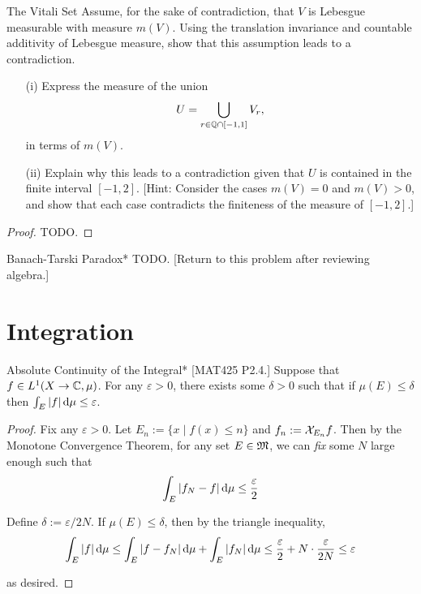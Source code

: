 \begin{problem}{The Vitali Set}
    Assume, for the sake of contradiction, that $V$ is Lebesgue measurable with measure $m(V)$. Using the translation invariance and countable additivity of Lebesgue measure, show that this assumption leads to a contradiction.

    \begin{itemize}
    \item[(i)] Express the measure of the union
    $$
        U = \bigcup_{r \in \mathbb{Q} \cap [-1,1]} V_r,
    $$
    in terms of $m(V)$.

    \item[(ii)] Explain why this leads to a contradiction given that $U$ is contained in the finite interval $[-1,2]$. [Hint: Consider the cases $m(V) = 0$ and $m(V) > 0$, and show that each case contradicts the finiteness of the measure of $[-1,2]$.]
    \end{itemize}
\end{problem}

\begin{proof}
    TODO. 
\end{proof}

\begin{problem}{Banach-Tarski Paradox}*
    TODO. [Return to this problem after reviewing algebra.]
\end{problem}

\newpage
\section{Integration}

\begin{problem}{Absolute Continuity of the Integral}*
    [MAT425 P2.4.] Suppose that $f \in L^1(X \to \mathbb{C}, \mu)$. For any $\varepsilon > 0$, there exists some $\delta > 0$ such that if $\mu(E) \leq \delta$ then $\int_E |f| \, \mathrm{d}\mu \leq \varepsilon$. 
\end{problem}

\begin{proof}
    Fix any $\varepsilon > 0$. Let $E_n := \{x \mid f(x) \leq n\}$ and $f_n := \mathcal{X}_{E_n}f$. Then by the Monotone Convergence Theorem, for any set $E \in \mathfrak{M}$, we can \textit{fix} some $N$ large enough such that
    $$
    \int_E |f_N - f| \, \mathrm{d}\mu \leq \frac{\varepsilon}{2}
    $$

    Define $\delta := \varepsilon / 2N$. If $\mu(E) \leq \delta$, then by the triangle inequality, 
    $$
    \int_E |f| \, \mathrm{d}\mu 
    \leq \int_E |f - f_N| \, \mathrm{d}\mu + \int_E |f_N| \, \mathrm{d}\mu
    \leq \frac{\varepsilon}{2} + N \cdot \frac{\varepsilon}{2N}
    \leq \varepsilon
    $$

    as desired. 
\end{proof}

